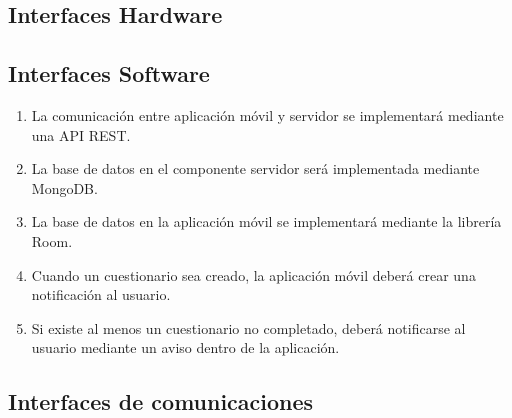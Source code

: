     \subsection{Interfaces Hardware}
    
    \subsection{Interfaces Software}
        \begin{enumerate}[label=\textbf{\texttt{RIS-\arabic*}}]
            \item La comunicación entre aplicación móvil y servidor se implementará mediante una API REST.
            \item La base de datos en el componente servidor será implementada mediante MongoDB.
            \item La base de datos en la aplicación móvil se implementará mediante la librería Room.
            \item Cuando un cuestionario sea creado, la aplicación móvil deberá crear una notificación al usuario.
            \item Si existe al menos un cuestionario no completado, deberá notificarse al usuario mediante un aviso dentro de la aplicación.
    
        \end{enumerate}
    
    \subsection{Interfaces de comunicaciones}
    

